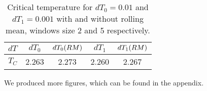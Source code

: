 \begin{table}[htbp]
	\centering
	\begin{tabular}{l|cccc}
		\textbf{$dT$} & $dT_0$ & $dT_0 \qty(RM)$ & $dT_1$ & $dT_1 \qty(RM)$  \\
		\midrule
		\addlinespace[0.1cm]

		\textbf{$T_C$} & 2.263 & 2.273 & 2.260 & 2.267 \\
	\end{tabular}
	\caption{Critical temperature for $dT_0 = 0.01$ and $dT_1 = 0.001$ with and without rolling mean, windows size 2 and 5 respectively.}
	\label{table:Tmax}
\end{table}

We produced more figures, which can be found in the appendix.
